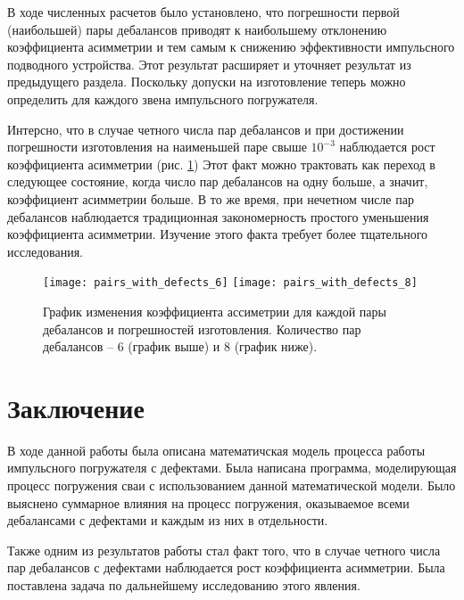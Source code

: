 В ходе численных расчетов было установлено, что погрешности первой (наибольшей) пары дебалансов приводят к наибольшему отклонению коэффициента
асимметрии и тем самым к снижению эффективности импульсного подводного устройства. Этот результат расширяет и уточняет результат из предыдущего раздела.
Поскольку допуски на изготовление теперь можно определить для каждого звена импульсного погружателя.

Интерсно, что в случае четного числа пар дебалансов и при достижении погрешности изготовления на наименьшей паре свыше $10^{-3}$ наблюдается рост
коэффициента асимметрии (рис. \ref{fig:pairs_with_defects_even}) Этот факт можно трактовать как переход в следующее состояние,
когда число пар дебалансов на одну больше, а значит, коэффициент асимметрии больше. В то же время, при нечетном числе пар дебалансов
наблюдается традиционная закономерность простого уменьшения коэффициента асимметрии.
Изучение этого факта требует более тщательного исследования.

\begin{figure}[ht]
    \centering
    \texttt{[image: pairs\_with\_defects\_6]}
    \texttt{[image: pairs\_with\_defects\_8]}
    \caption{График изменения коэффициента ассиметрии для каждой пары дебалансов и погрешностей изготовления.
    Количество пар дебалансов -- 6 (график выше) и 8 (график ниже).}
    \label{fig:pairs_with_defects_even}
\end{figure}

\clearpage

\section*{Заключение}

В ходе данной работы была описана математичская модель процесса работы импульсного погружателя с дефектами. Была
написана программа, моделирующая процесс погружения сваи с использованием данной математической модели. Было выяснено
суммарное влияния на процесс погружения, оказываемое всеми дебалансами с дефектами и каждым из них в отдельности.

Также одним из результатов работы стал факт того, что в случае четного числа пар дебалансов с дефектами наблюдается
рост коэффициента асимметрии. Была поставлена задача по дальнейшему исследованию этого явления.

\clearpage


